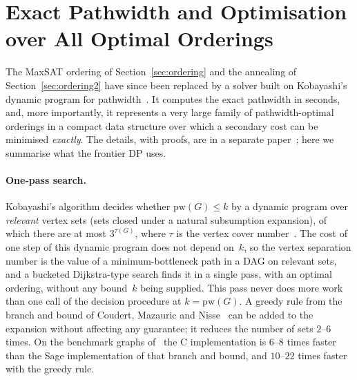 \documentclass[12pt]{article}
\theoremstyle{definition}
\newcommand{\pw}{\mathrm{pw}}
\begin{document}
\section{Exact Pathwidth and Optimisation over All Optimal Orderings}
\label{sec:kpw}

The MaxSAT ordering of Section~\ref{sec:ordering} and the annealing of
Section~\ref{sec:ordering2} have since been replaced by a solver built on
Kobayashi's dynamic program for pathwidth~\cite{Kob15}.
It computes the exact pathwidth in seconds, and, more importantly, it
represents a very large family of pathwidth-optimal orderings in a compact
data structure over which a secondary cost can be minimised \emph{exactly}.
The details, with proofs, are in a separate paper~\cite{MillerPathwidth};
here we summarise what the frontier DP uses.

\paragraph{One-pass search.}
Kobayashi's algorithm decides whether $\pw(G)\le k$ by a dynamic program over
\emph{relevant} vertex sets (sets closed under a natural subsumption
expansion), of which there are at most $3^{\tau(G)}$, where $\tau$ is the
vertex cover number~\cite{Kob15,CLTV13}.
The cost of one step of this dynamic program does not depend on~$k$, so the
vertex separation number is the value of a minimum-bottleneck path in a DAG
on relevant sets, and a bucketed Dijkstra-type search finds it in a single
pass, with an optimal ordering, without any bound~$k$ being supplied.
This pass never does more work than one call of the decision procedure at
$k=\pw(G)$.
A greedy rule from the branch and bound of Coudert, Mazauric and
Nisse~\cite{CMN14} can be added to the expansion without affecting any
guarantee; it reduces the number of sets $2$--$6$ times.
On the benchmark graphs of~\cite{MillerPathwidth} the C implementation is
$6$--$8$ times faster than the Sage implementation of that branch and bound,
and $10$--$22$ times faster with the greedy rule.
\end{document}

